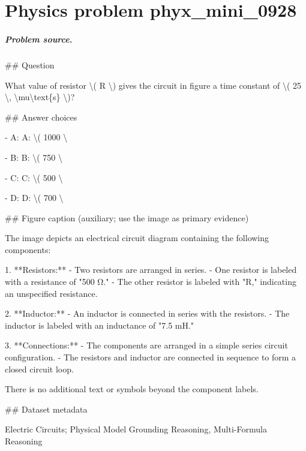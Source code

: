 
\chapter{Physics problem phyx\_mini\_0928}
\label{ch:PhyXMiniProblems_problem_phyx_mini_0928}

\paragraph{Problem source.}
\#\# Question

What value of resistor \textbackslash{}( R \textbackslash{}) gives the circuit in figure a time constant of \textbackslash{}( 25 \textbackslash{}, \textbackslash{}mu\textbackslash{}text\{s\} \textbackslash{})?

\#\# Answer choices

- A: A: \textbackslash{}( 1000 \textbackslash{}

- B: B: \textbackslash{}( 750 \textbackslash{}

- C: C: \textbackslash{}( 500 \textbackslash{}

- D: D: \textbackslash{}( 700 \textbackslash{}

\#\# Figure caption (auxiliary; use the image as primary evidence)

The image depicts an electrical circuit diagram containing the following components:

1. **Resistors:**
   - Two resistors are arranged in series.
   - One resistor is labeled with a resistance of "500 Ω."
   - The other resistor is labeled with "R," indicating an unspecified resistance.

2. **Inductor:**
   - An inductor is connected in series with the resistors.
   - The inductor is labeled with an inductance of "7.5 mH."

3. **Connections:**
   - The components are arranged in a simple series circuit configuration.
   - The resistors and inductor are connected in sequence to form a closed circuit loop.

There is no additional text or symbols beyond the component labels.

\#\# Dataset metadata

Electric Circuits; Physical Model Grounding Reasoning, Multi-Formula Reasoning

